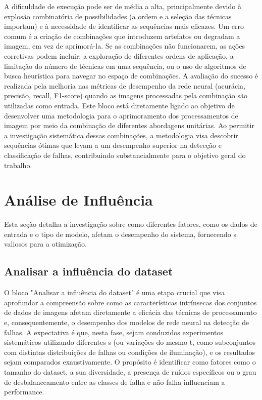 A dificuldade de execução pode ser de média a alta, principalmente devido à explosão combinatória de possibilidades (a ordem e a seleção das técnicas importam) e à necessidade de identificar as sequências mais eficazes. Um erro comum é a criação de combinações que introduzem artefatos ou degradam a imagem, em vez de aprimorá-la. Se as combinações não funcionarem, as ações corretivas podem incluir: a exploração de diferentes ordens de aplicação, a limitação do número de técnicas em uma sequência, ou o uso de algoritmos de busca heurística para navegar no espaço de combinações. A avaliação do sucesso é realizada pela melhoria nas métricas de desempenho da rede neural (acurácia, precisão, recall, F1-score) quando as imagens processadas pela combinação são utilizadas como entrada. Este bloco está diretamente ligado ao objetivo de desenvolver uma metodologia para o aprimoramento dos processamentos de imagem por meio da combinação de diferentes abordagens unitárias. Ao permitir a investigação sistemática dessas combinações, a metodologia visa descobrir sequências ótimas que levam a um desempenho superior na detecção e classificação de falhas, contribuindo substancialmente para o objetivo geral do trabalho.

\section{Análise de Influência}

Esta seção detalha a investigação sobre como diferentes fatores, como os dados de entrada e o tipo de modelo, afetam o desempenho do sistema, fornecendo s valiosos para a otimização.

\subsection{Analisar a influência do dataset}
O bloco "Analisar a influência do dataset" é uma etapa crucial que visa aprofundar a compreensão sobre como as características intrínsecas dos conjuntos de dados de imagens afetam diretamente a eficácia das técnicas de processamento e, consequentemente, o desempenho dos modelos de rede neural na detecção de falhas. A expectativa é que, nesta fase, sejam conduzidos experimentos sistemáticos utilizando diferentes s (ou variações do mesmo t, como subconjuntos com distintas distribuições de falhas ou condições de iluminação), e os resultados sejam comparados exaustivamente. O propósito é identificar como fatores como o tamanho do dataset, a sua diversidade, a presença de ruídos específicos ou o grau de desbalanceamento entre as classes de falha e não falha influenciam a performance.

